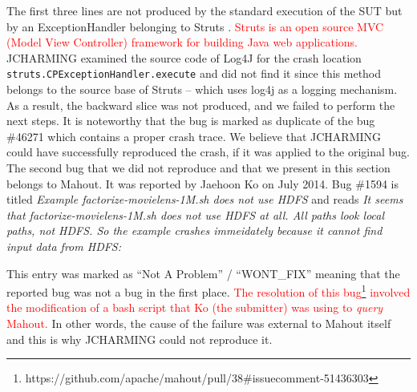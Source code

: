 \documentclass[times, doublespace]{smrauth}
\newcommand{\red}[1]{\textcolor{red}{#1}}
\begin{document}
\vspace*{0.3cm}


The first three lines are not produced by the standard
execution of the SUT but by an ExceptionHandler belonging
to Struts \cite{ApacheSoftwareFoundation2000}. \red{Struts is an open source MVC (Model View
Controller) framework for building Java web applications.}
JCHARMING examined the source code of Log4J for the
crash location {\tt struts.CPExceptionHandler.execute} and did not
find it since this method belongs to the source base of Struts
-- which uses log4j as a logging mechanism. As a result, the
backward slice was not produced, and we failed to perform the
next steps. It is noteworthy that the bug is marked as duplicate
of the bug \#46271 which contains a proper crash trace. We
believe that JCHARMING could have successfully
reproduced the crash, if it was applied to the original bug. \\

The second bug that we did not reproduce and
that we present in this section belongs to Mahout. It was reported by
Jaehoon Ko on July 2014. Bug \#1594 is titled {\it Example factorize-movielens-1M.sh does not use HDFS}
and reads {\it It seems that factorize-movielens-1M.sh does not use HDFS at all.
All paths look local paths, not HDFS. So the example crashes
immeidately because it cannot find input data from HDFS: }

\vspace*{0.3cm}

\noindent{}

\vspace*{0.3cm}

This entry was marked as ``Not A Problem'' / ``WONT\_FIX'' meaning that
the reported bug was not a bug in the first place.
\red{The resolution of this bug\footnote{https://github.com/apache/mahout/pull/38\#issuecomment-51436303}
involved the modification of a bash script that Ko (the submitter) was using to {\it query} Mahout.} In other words, the cause of the failure was external to Mahout itself and this is why JCHARMING could not reproduce it.
\end{document}
